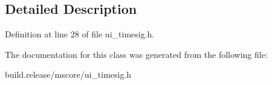 \subsection{Detailed Description}


Definition at line 28 of file ui\+\_\+timesig.\+h.



The documentation for this class was generated from the following file\+:\begin{DoxyCompactItemize}
\item 
build.\+release/mscore/ui\+\_\+timesig.\+h\end{DoxyCompactItemize}
